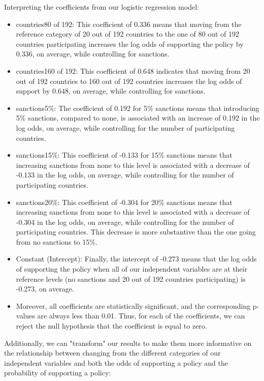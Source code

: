 \documentclass[12pt,letterpaper]{article}
\begin{document}
\begin{enumerate}
	\newpage
	\noindent Interpreting the coefficients from our logistic regression model:
	\begin{itemize}
		\item countries80 of 192: This coefficient of 0.336 means that moving from the reference category of 20 out of 192 countries to the one of 80 out of 192 countries participating increases the log odds of supporting the policy by 0.336, on average, while controlling for sanctions. 
		\item countries160 of 192: This coefficient of 0.648 indicates that moving from 20 out of 192 countries to 160 out of 192 countries increases the log odds of support by 0.648, on average, while controlling for sanctions. 
		\item sanctions5\%: The coefficient of 0.192 for 5\% sanctions means that introducing 5\% sanctions, compared to none, is associated with an increase of 0.192 in the log odds, on average, while controlling for the number of participating countries. 
		\item sanctions15\%: This coefficient of -0.133 for 15\% sanctions means that increasing sanctions from none to this level is associated with a decrease of -0.133 in the log odds, on average, while controlling for the number of participating countries. 
		\item sanctions20\%: This coefficient of -0.304 for 20\% sanctions means that increasing sanctions from none to this level is associated with a decrease of -0.304 in the log odds, on average, while controlling for the number of participating countries. This decrease is more substantive than the one going from no sanctions to 15\%. 
		\item Constant (Intercept): Finally, the intercept of -0.273 means that the log odds of supporting the policy when all of our independent variables are at their reference levels (no sanctions and 20 out of 192 countries participating) is -0.273, on average. 
		\item Moreover, all coefficients are statistically significant, and the corresponding p-values are always less than 0.01. Thus, for each of the coefficients, we can reject the null hypothesis that the coefficient is equal to zero. 
	\end{itemize}
	
	\newpage
	\noindent Additionally, we can "transform" our results to make them more informative on the relationship between changing from the different categories of our independent variables and both the odds of supporting a policy and the probability of supporting a policy:
	\vspace{.25cm} 	
	

\end{enumerate}
\end{document}
